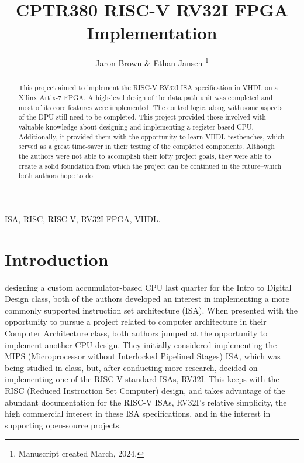 \documentclass[lettersize,journal]{IEEEtran}
\begin{document}
\title{CPTR380 RISC-V RV32I FPGA Implementation}
\author{Jaron Brown \& Ethan Jansen
\thanks{Manuscript created March, 2024.}}

\maketitle

\begin{abstract}
This project aimed to implement the RISC-V RV32I ISA specification in VHDL on a Xilinx Artix-7 FPGA.
A high-level design of the data path unit was completed and most of its core features were implemented.
The control logic, along with some aspects of the DPU still need to be completed.
This project provided those involved with valuable knowledge about designing and implementing a register-based CPU.
Additionally, it provided them with the opportunity to learn VHDL testbenches, which served as a great time-saver in their testing of the completed components.
Although the authors were not able to accomplish their lofty project goals, they were able to create a solid foundation from which the project can be continued in the future--which both authors hope to do.
\end{abstract}

\begin{IEEEkeywords}
ISA, RISC, RISC-V, RV32I FPGA, VHDL.
\end{IEEEkeywords}


\section{Introduction}
 designing a custom accumulator-based CPU last quarter for the Intro to Digital Design class, 
both of the authors developed an interest in implementing a more commonly supported instruction set architecture (ISA). 
When presented with the opportunity to pursue a project related to computer architecture in their Computer Architecture class, 
both authors jumped at the opportunity to implement another CPU design.
They initially considered implementing the MIPS (Microprocessor without Interlocked Pipelined Stages) ISA, which was being studied in class, but, 
after conducting more research, decided on implementing one of the RISC-V standard ISAs, RV32I.
This keeps with the RISC (Reduced Instruction Set Computer) design, and takes advantage of the abundant documentation for the RISC-V ISAs, RV32I's relative simplicity, the high commercial interest in these ISA specifications,
and in the interest in supporting open-source projects.
\end{document}
